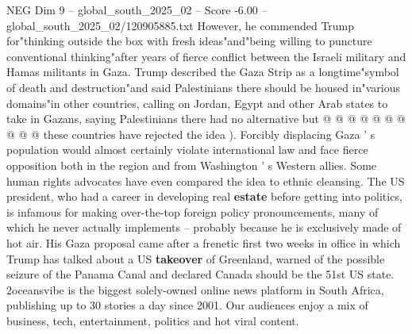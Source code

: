 \begin{textsample}{NEG Dim 9 – global\_south\_2025\_02 – Score -6.00 – global\_south\_2025\_02/120905885.txt}
However, he commended Trump for"thinking outside the box with fresh ideas"and"being willing to puncture conventional thinking"after years of fierce conflict between the Israeli military and Hamas militants in Gaza.
Trump described the Gaza Strip as a longtime"symbol of death and destruction"and said Palestinians there should be housed in"various domains"in other countries, calling on Jordan, Egypt and other Arab states to take in Gazans, saying Palestinians there had no alternative but @ @ @ @ @ @ @ @ @ @ these countries have rejected the idea ).
Forcibly displacing Gaza ' s population would almost certainly violate international law and face fierce opposition both in the region and from Washington ' s Western allies.
Some human rights advocates have even compared the idea to ethnic cleansing.
The US president, who had a career in developing real \textbf{estate} before getting into politics, is infamous for making over-the-top foreign policy pronouncements, many of which he never actually implements -- probably because he is exclusively made of hot air.
His Gaza proposal came after a frenetic first two weeks in office in which Trump has talked about a US \textbf{takeover} of Greenland, warned of the possible seizure of the Panama Canal and declared Canada should be the 51st US state. 2oceansvibe is the biggest solely-owned online news platform in South Africa, publishing up to 30 stories a day since 2001.
Our audiences enjoy a mix of business, tech, entertainment, politics and hot viral content.

\end{textsample}
